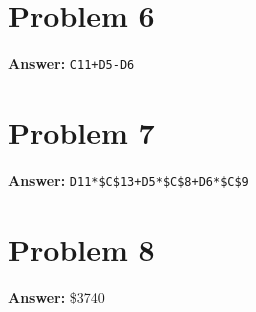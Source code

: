 \documentclass[11pt]{article}
\begin{document}
\section*{Problem 6}
\label{sec:org5ae45bb}

\textbf{Answer:} \texttt{C11+D5-D6}
\section*{Problem 7}
\label{sec:org60510a7}

\textbf{Answer:} \texttt{D11*\$C\$13+D5*\$C\$8+D6*\$C\$9}
\section*{Problem 8}
\label{sec:org38ae723}

\textbf{Answer:} \$3740\\
\end{document}
